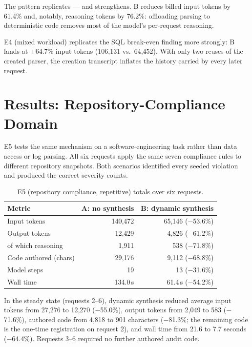 The pattern replicates --- and strengthens. B reduces billed input tokens by 61.4\%
and, notably, reasoning tokens by 76.2\%: offloading parsing to deterministic code
removes most of the model's per-request reasoning.

E4 (mixed workload) replicates the SQL break-even finding more strongly: B lands at
+64.7\% input tokens (106{,}131 vs.\ 64{,}452). With only two reuses of the created
parser, the creation transcript inflates the history carried by every later request.

\section{Results: Repository-Compliance Domain}
E5 tests the same mechanism on a software-engineering task rather than data access or
log parsing. All six requests apply the same seven compliance rules to different
repository snapshots. Both scenarios identified every seeded violation and produced
the correct severity counts.

\begin{table}[htbp]
    \centering
    \caption{E5 (repository compliance, repetitive) totals over six requests.}
    \label{tab:e5_totals}
    \small
    \begin{tabular}{@{}lrr@{}}
        \toprule
        \textbf{Metric} & \textbf{A: no synthesis} & \textbf{B: dynamic synthesis} \\
        \midrule
        Input tokens         & 140{,}472 & 65{,}146 ($-$53.6\%) \\
        Output tokens        & 12{,}429  & 4{,}826 ($-$61.2\%) \\
        \quad of which reasoning & 1{,}911 & 538 ($-$71.8\%) \\
        Code authored (chars)& 29{,}176 & 9{,}112 ($-$68.8\%) \\
        Model steps          & 19 & 13 ($-$31.6\%) \\
        Wall time            & 134.0\,s & 61.4\,s ($-$54.2\%) \\
        \bottomrule
    \end{tabular}
\end{table}

In the steady state (requests 2--6), dynamic synthesis reduced average input tokens
from 27{,}276 to 12{,}270 ($-$55.0\%), output tokens from 2{,}049 to 583
($-$71.6\%), authored code from 4{,}818 to 901 characters ($-$81.3\%; the remaining
code is the one-time registration on request 2), and wall time from 21.6 to 7.7 seconds
($-$64.4\%). Requests 3--6 required no further authored audit code.


